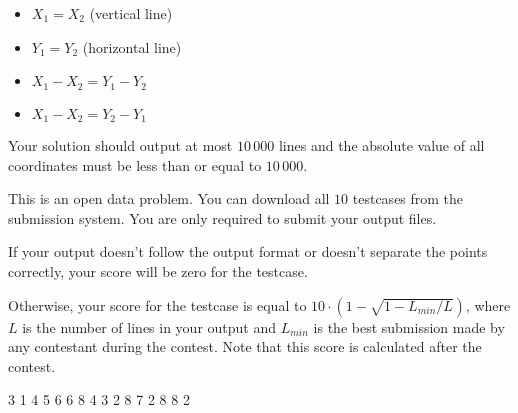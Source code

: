 \begin{itemize}
  \item $X_1 = X_2$ (vertical line)
  \item $Y_1 = Y_2$ (horizontal line)
  \item $X_1 - X_2 = Y_1 - Y_2$
  \item $X_1 - X_2 = Y_2 - Y_1$
\end{itemize}

Your solution should output at most $10\,000$ lines and the absolute value of all coordinates must be less than or equal to $10\,000$.

This is an open data problem. You can download all $10$ testcases from the submission system. You are only required to submit your output files.

If your output doesn't follow the output format or doesn't separate the points correctly, your score will be zero for the testcase.

Otherwise, your score for the testcase is equal to
$ 10 \cdot \left(1 - \sqrt{1 - L_{min} / L}\right)$,
where $L$ is the number of lines in your output and $L_{min}$ is the best submission made by any contestant during the contest.
Note that this score is calculated after the contest.


3 1
4 5
6 6
8 4
3 2 8 7
2 8 8 2
\sampleEND


